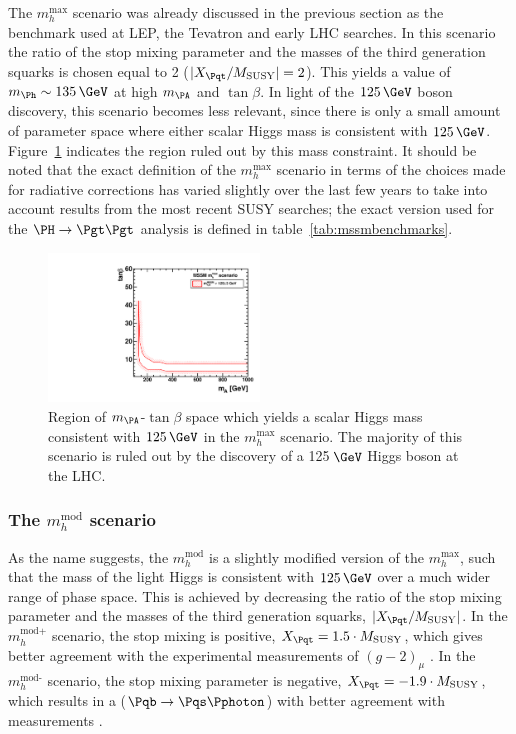The $m_{h}^{\text{max}}$ scenario was already discussed in the previous section
as the benchmark used at LEP, the Tevatron and early LHC searches. 
In this scenario the ratio of the stop mixing parameter and the
masses of the third generation squarks is chosen equal to 2
($|X_{\Pqt}/M_{\text{SUSY}}| = 2$). This yields a value of
$m_{\Ph}\sim135\,\GeV$ at high $m_{\PA}$ and $\tan\beta$. 
In light of the $125\,\GeV$ boson discovery, this scenario becomes less relevant,
since there is only a small amount of parameter space where either scalar
Higgs mass is consistent with $125\,\GeV$. Figure~\ref{fig:mhmaxmass} indicates
the region ruled out by this mass constraint. It should be noted that the exact
definition of the $m_{h}^{\text{max}}$ scenario in terms of the choices made for
radiative corrections has varied slightly over the
last few years to take into account results from the most recent \ac{SUSY}
searches; the exact version used for the $\HToTauTau$ analysis is defined in
table~\ref{tab:mssmbenchmarks}.

\begin{figure}[htbp]
   \includegraphics[width=0.5\textwidth]{plots/theory/cmb_mhmax-HypoTest.pdf}
\caption[Region of $m_{\PA}$-$\tan\beta$ space which yields a scalar Higgs mass 
consistent with $125\,\GeV$ in the $m_{h}^{\text{max}}$ scenario.]
{Region of $m_{\PA}$-$\tan\beta$ space which yields a scalar Higgs mass 
consistent with $125\,\GeV$ in the $m_{h}^{\text{max}}$ scenario. The majority of
this scenario is ruled out by the discovery of a 125$\,\GeV$ Higgs boson at the
LHC.}
\label{fig:mhmaxmass}
\end{figure}

\subsubsection{The $m_{h}^{\text{mod}}$ scenario}
\label{sec:mhmodscenario}

As the name suggests, the $m_{h}^{\text{mod}}$ is a slightly modified version of
the $m_{h}^{\text{max}}$, such that the mass of the light Higgs is consistent
with $125\,\GeV$ over a much wider range of phase space. This is achieved by
decreasing the ratio of the stop mixing parameter and the masses of the third
generation squarks, $|X_{\Pqt}/M_{\text{SUSY}}|$. In the $m_{h}^{\text{mod+}}$
scenario, the stop mixing is positive, $X_{\Pqt} = 1.5 \cdot M_{\text{SUSY}}$,
which gives better agreement with the experimental measurements of $(g-2)_{\mu}$
\cite{Miller:2007kk}. In the $m_{h}^{\text{mod-}}$ scenario, the stop mixing parameter is
negative, $X_{\Pqt} = -1.9 \cdot M_{\text{SUSY}}$, which results in a
($\Pqb\to\Pqs\Pphoton$) with better agreement with measurements
\cite{Lees:2012wg}.

